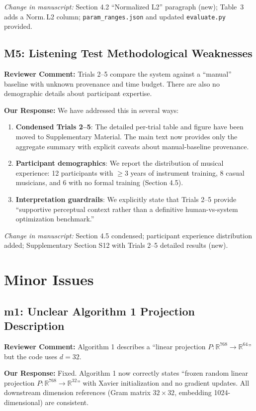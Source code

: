 \documentclass[11pt]{article}
\newcommand{\reviewer}[1]{\textcolor{reviewercolor}{\textbf{Reviewer Comment:} #1}}
\newcommand{\response}[1]{\textcolor{responsecolor}{\textbf{Our Response:} #1}}
\newcommand{\change}[1]{\textit{Change in manuscript:} #1}
\begin{document}
\change{Section 4.2 ``Normalized L2'' paragraph (new); Table~3 adds a Norm.\,L2 column; \texttt{param\_ranges.json} and updated \texttt{evaluate.py} provided.}

\subsection*{M5: Listening Test Methodological Weaknesses}

\reviewer{Trials 2--5 compare the system against a ``manual'' baseline with unknown provenance and time budget. There are also no demographic details about participant expertise.}

\response{We have addressed this in several ways:}

\begin{enumerate}[leftmargin=*]
\item \textbf{Condensed Trials 2--5}: The detailed per-trial table and figure have been moved to Supplementary Material. The main text now provides only the aggregate summary with explicit caveats about manual-baseline provenance.
\item \textbf{Participant demographics}: We report the distribution of musical experience: 12 participants with $\geq$3 years of instrument training, 8 casual musicians, and 6 with no formal training (Section 4.5).
\item \textbf{Interpretation guardrails}: We explicitly state that Trials 2--5 provide ``supportive perceptual context rather than a definitive human-vs-system optimization benchmark.''
\end{enumerate}

\change{Section 4.5 condensed; participant experience distribution added; Supplementary Section S12 with Trials 2--5 detailed results (new).}

\section*{Minor Issues}

\subsection*{m1: Unclear Algorithm 1 Projection Description}

\reviewer{Algorithm 1 describes a ``linear projection $P: \mathbb{R}^{768} \to \mathbb{R}^{64}$'' but the code uses $d{=}32$.}

\response{Fixed. Algorithm 1 now correctly states ``frozen random linear projection $P: \mathbb{R}^{768} \to \mathbb{R}^{32}$'' with Xavier initialization and no gradient updates. All downstream dimension references (Gram matrix $32 \times 32$, embedding 1024-dimensional) are consistent.}
\end{document}
